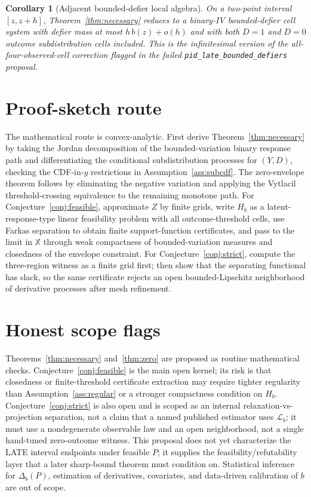 \documentclass[11pt]{article}
\theoremstyle{definition}
\theoremstyle{plain}
\newtheorem{corollary}{Corollary}
\theoremstyle{remark}
\begin{document}
\begin{corollary}[Adjacent bounded-defier local algebra]\label{cor:binary}
On a two-point interval \([z,z+h]\), Theorem~\ref{thm:necessary} reduces to a binary-IV bounded-defier cell system with defier mass at most \(h\,b(z)+o(h)\) and with both \(D=1\) and \(D=0\) outcome subdistribution cells included.  This is the infinitesimal version of the all-four-observed-cell correction flagged in the failed \texttt{pid\_late\_bounded\_defiers} proposal.
\end{corollary}

\section{Proof-sketch route}
The mathematical route is convex-analytic.  First derive Theorem~\ref{thm:necessary} by taking the Jordan decomposition of the bounded-variation binary response path and differentiating the conditional subdistribution processes for \((Y,D)\), checking the CDF-in-\(y\) restrictions in Assumption~\ref{ass:subcdf}.  The zero-envelope theorem follows by eliminating the negative variation and applying the Vytlacil threshold-crossing equivalence to the remaining monotone path.  For Conjecture~\ref{conj:feasible}, approximate \(Z\) by finite grids, write \(H_b\) as a latent-response-type linear feasibility problem with all outcome-threshold cells, use Farkas separation to obtain finite support-function certificates, and pass to the limit in \(\mathbb X\) through weak compactness of bounded-variation measures and closedness of the envelope constraint.  For Conjecture~\ref{conj:strict}, compute the three-region witness as a finite grid first; then show that the separating functional has slack, so the same certificate rejects an open bounded-Lipschitz neighborhood of derivative processes after mesh refinement.

\section{Honest scope flags}
Theorems~\ref{thm:necessary} and~\ref{thm:zero} are proposed as routine mathematical checks.  Conjecture~\ref{conj:feasible} is the main open kernel; its risk is that closedness or finite-threshold certificate extraction may require tighter regularity than Assumption~\ref{ass:regular} or a stronger compactness condition on \(H_b\).  Conjecture~\ref{conj:strict} is also open and is scoped as an internal relaxation-vs-projection separation, not a claim that a named published estimator uses \(\mathcal L_b\); it must use a nondegenerate observable law and an open neighborhood, not a single hand-tuned zero-outcome witness.  This proposal does not yet characterize the LATE interval endpoints under feasible \(P\); it supplies the feasibility/refutability layer that a later sharp-bound theorem must condition on.  Statistical inference for \(\Delta_b(P)\), estimation of derivatives, covariates, and data-driven calibration of \(b\) are out of scope.
\end{document}

